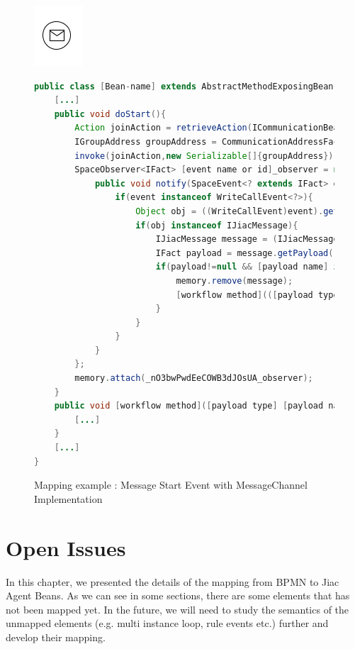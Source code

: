 \begin{figure}[h]
\begin{minipage}[c]{0.28\textwidth}
\includegraphics{images/mapping/message_start.png}
\end{minipage}
\begin{minipage}[c]{0.72\textwidth}
\begin{lstlisting}[language = Java]
public class [Bean-name] extends AbstractMethodExposingBean{
	[...]
	public void doStart(){
		Action joinAction = retrieveAction(ICommunicationBean.ACTION_JOIN_GROUP);
		IGroupAddress groupAddress = CommunicationAddressFactory.createGroupAddress([channel]);
		invoke(joinAction,new Serializable[]{groupAddress});
		SpaceObserver<IFact> [event name or id]_observer = new SpaceObserver<IFact>(){
			public void notify(SpaceEvent<? extends IFact> event) { 
				if(event instanceof WriteCallEvent<?>){
					Object obj = ((WriteCallEvent)event).getObject();
					if(obj instanceof IJiacMessage){ 
						IJiacMessage message = (IJiacMessage)obj;
						IFact payload = message.getPayload();
						if(payload!=null && [payload name] instanceof [payload type] &&  message.getHeader(IJiacMessage.Header.SEND_TO).equalsIgnoreCase([channel]){
							memory.remove(message);
							[workflow method](([payload type])payload);
						}
					}
				}
			}
		};
		memory.attach(_nO3bwPwdEeCOWB3dJOsUA_observer);
	}
	public void [workflow method]([payload type] [payload name]){
		[...]
	}	
	[...]
}
\end{lstlisting}
\end{minipage}
\caption{Mapping example : Message Start Event with MessageChannel Implementation}%
\label{fig:channel_start}
\end{figure}

\newpage
\section{Open Issues}

In this chapter, we presented the details of the mapping from BPMN to Jiac Agent Beans. As we can see in some sections, there are some elements that has not been mapped yet. In the future, we will need to study the semantics of the unmapped elements (e.g. multi instance loop, rule events etc.) further and develop their mapping.